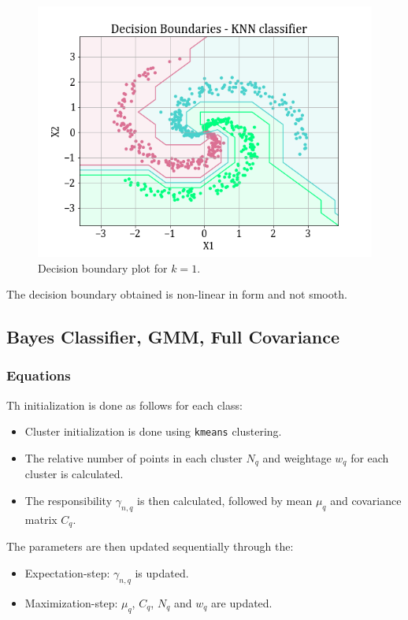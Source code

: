 \documentclass[11pt,a4paper]{article}
\newcommand{\noi}{\noindent}
\def\tt#1{\texttt{#1}}
\begin{document}
\begin{figure}[H]
    \centering
    \includegraphics[scale=0.7]{images/1B/1b_KNN_decision_region.png}
    \caption{Decision boundary plot for $k=1$.}
    \label{fig:1b_decreg_KNN}
\end{figure}

\noi
The decision boundary obtained is non-linear in form and not smooth. 

\break
\subsection{Bayes Classifier, GMM, Full Covariance}
\subsubsection{Equations}
Th initialization is done as follows for each class:
\begin{itemize}
    \itemsep0em
    \item Cluster initialization is done using \tt{kmeans} clustering.
    \item The relative number of points in each cluster $N_q$ and weightage $w_q$ for each cluster is calculated.
    \item The responsibility $\gamma_{n,q}$ is then calculated, followed by mean $\mu_q$ and covariance matrix $C_q$.
\end{itemize}

\noi
The parameters are then updated sequentially through the:
\begin{itemize}
    \itemsep0em
    \item Expectation-step: $\gamma_{n,q}$ is updated.
    \item Maximization-step: $\mu_q$, $C_q$, $N_q$ and $w_q$ are updated.
\end{itemize}
\end{document}
